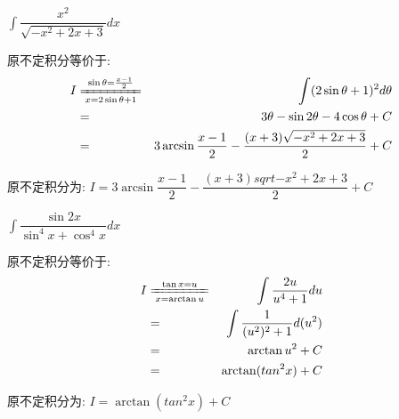 \begin{proposition}
	$\int \dfrac{x^2}{\sqrt{-x^2+2x+3}}dx$
\end{proposition}
\begin{solution}
		
	原不定积分等价于:  
	\begin{eqnarray*}
		I&\xlongequal[x=2\sin\theta+1]{\sin\theta=\frac{x-1}{2}}&\int (2\sin\theta+1)^2d\theta\\
		&=&3\theta-\sin2\theta-4\cos\theta+C\\
		&=&3\arcsin\dfrac{x-1}{2}-\dfrac{(x+3)\sqrt{-x^2+2x+3}}{2}+C
	\end{eqnarray*}
	
	原不定积分为:  $I=3\arcsin\dfrac{x-1}{2}-\dfrac{(x+3)sqrt{-x^2+2x+3}}{2}+C$
\end{solution}

\begin{proposition}
	$\int \dfrac{\sin 2x}{\sin^4 x+\cos^4 x}dx$
\end{proposition}
\begin{solution}
		
	原不定积分等价于:  
	\begin{eqnarray*}
		I&\xlongequal[x=\arctan u]{\tan x=u}&\int \dfrac{2u}{u^4+1}du\\
		&=&\int \dfrac{1}{(u^2)^2+1}d(u^2)\\
		&=&\arctan u^2+C\\
		&=&\arctan(tan^2 x)+C
	\end{eqnarray*}
	
	原不定积分为:  $I=\arctan(tan^2 x)+C$
\end{solution}

